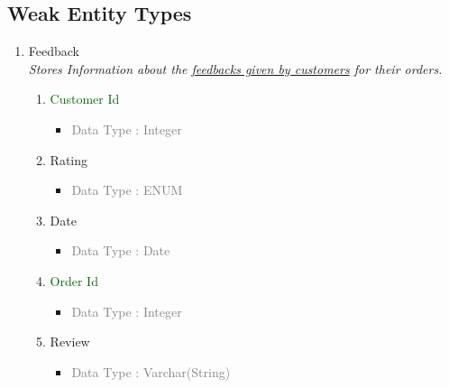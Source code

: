 \subsection{Weak Entity Types}
    \begin{enumerate}
        \item Feedback \\
        \textit{Stores Information about the \underline{feedbacks given by customers} for their orders.}
            \begin{enumerate}[label=\alph*.]
                \item \textcolor{darkgreen}{Customer Id}
                    \begin{itemize}[label=-]
                        \item \textcolor{gray}{Data Type : Integer}
                    \end{itemize}
                \item Rating
                    \begin{itemize}[label=-]
                        \item \textcolor{gray}{Data Type : ENUM}
                    \end{itemize}
                \item Date
                    \begin{itemize}[label=-]
                        \item \textcolor{gray}{Data Type : Date}
                    \end{itemize}
                \item \textcolor{darkgreen}{Order Id}
                    \begin{itemize}[label=-]
                        \item \textcolor{gray}{Data Type : Integer}
                    \end{itemize}
                \item Review
                    \begin{itemize}[label=-]
                        \item \textcolor{gray}{Data Type : Varchar(String)}
                    \end{itemize}
            \end{enumerate}
        

\end{enumerate}
